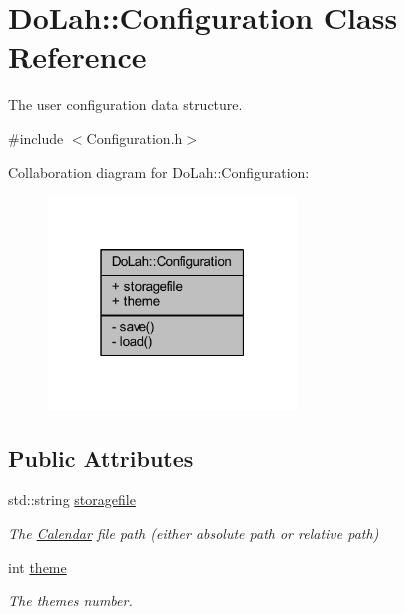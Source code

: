 \hypertarget{class_do_lah_1_1_configuration}{}\section{Do\+Lah\+:\+:Configuration Class Reference}
\label{class_do_lah_1_1_configuration}


The user configuration data structure.  




{\ttfamily \#include $<$Configuration.\+h$>$}



Collaboration diagram for Do\+Lah\+:\+:Configuration\+:
\nopagebreak
\begin{figure}[H]
\begin{center}
\leavevmode
\includegraphics[width=187pt]{class_do_lah_1_1_configuration__coll__graph}
\end{center}
\end{figure}
\subsection*{Public Attributes}
\begin{DoxyCompactItemize}
\item 
std\+::string \hyperlink{class_do_lah_1_1_configuration_a18677d9cc2cdecba1b4d2d69320135b4}{storagefile}
\begin{DoxyCompactList}\small\item\em The \hyperlink{class_do_lah_1_1_calendar}{Calendar} file path (either absolute path or relative path) \end{DoxyCompactList}\item 
int \hyperlink{class_do_lah_1_1_configuration_ae53919c98ff4c97b8ec92cfd056c793c}{theme}
\begin{DoxyCompactList}\small\item\em The themes number. \end{DoxyCompactList}\end{DoxyCompactItemize}
